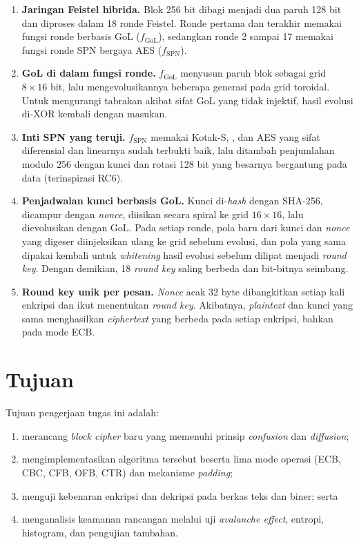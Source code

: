 \begin{enumerate}
    \item \textbf{Jaringan Feistel hibrida.} Blok 256 bit dibagi menjadi dua paruh 128 bit dan diproses dalam 18 ronde Feistel. Ronde pertama dan terakhir memakai fungsi ronde berbasis GoL ($f_{\text{GoL}}$), sedangkan ronde 2 sampai 17 memakai fungsi ronde SPN bergaya AES ($f_{\text{SPN}}$).
    \item \textbf{GoL di dalam fungsi ronde.} $f_{\text{GoL}}$ menyusun paruh blok sebagai grid $8 \times 16$ bit, lalu mengevolusikannya beberapa generasi pada grid toroidal. Untuk mengurangi tabrakan akibat sifat GoL yang tidak injektif, hasil evolusi di-XOR kembali dengan masukan.
    \item \textbf{Inti SPN yang teruji.} $f_{\text{SPN}}$ memakai Kotak-S, , dan  AES yang sifat diferensial dan linearnya sudah terbukti baik, lalu ditambah penjumlahan modulo 256 dengan kunci dan rotasi 128 bit yang besarnya bergantung pada data (terinspirasi RC6).
    \item \textbf{Penjadwalan kunci berbasis GoL.} Kunci di-\textit{hash} dengan SHA-256, dicampur dengan \textit{nonce}, diisikan secara spiral ke grid $16 \times 16$, lalu dievolusikan dengan GoL. Pada setiap ronde, pola baru dari kunci dan \textit{nonce} yang digeser diinjeksikan ulang ke grid sebelum evolusi, dan pola yang sama dipakai kembali untuk \textit{whitening} hasil evolusi sebelum dilipat menjadi \textit{round key}. Dengan demikian, 18 \textit{round key} saling berbeda dan bit-bitnya seimbang.
    \item \textbf{Round key unik per pesan.} \textit{Nonce} acak 32 byte dibangkitkan setiap kali enkripsi dan ikut menentukan \textit{round key}. Akibatnya, \textit{plaintext} dan kunci yang sama menghasilkan \textit{ciphertext} yang berbeda pada setiap enkripsi, bahkan pada mode ECB.
\end{enumerate}

\section{Tujuan}
Tujuan pengerjaan tugas ini adalah:
\begin{enumerate}
    \item merancang \textit{block cipher} baru yang memenuhi prinsip \textit{confusion} dan \textit{diffusion};
    \item mengimplementasikan algoritma tersebut beserta lima mode operasi (ECB, CBC, CFB, OFB, CTR) dan mekanisme \textit{padding};
    \item menguji kebenaran enkripsi dan dekripsi pada berkas teks dan biner; serta
    \item menganalisis keamanan rancangan melalui uji \textit{avalanche effect}, entropi, histogram, dan pengujian tambahan.
\end{enumerate}

